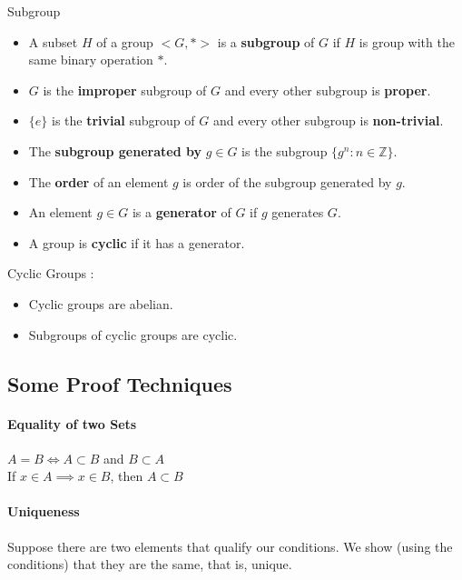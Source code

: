 \begin{definition} Subgroup
	\begin{itemize}
		\item A subset $H$ of a group $<\! G,\ast\! >$ is a \textbf{subgroup} of $G$ if $H$ is group with the same binary operation $\ast$. %
		\item $G$ is the \textbf{improper} subgroup of $G$ and every other subgroup is \textbf{proper}.%
		\item $\{e\}$ is the \textbf{trivial} subgroup of $G$ and every other subgroup is \textbf{non-trivial}.%
		\item The \textbf{subgroup generated by} $g \in G$ is the subgroup $\{ g^n : n \in \mathbb{Z} \}$.%
		\item The \textbf{order} of an element $g$ is order of the subgroup generated by $g$.%
		\item An element $g \in G$ is a \textbf{generator} of $G$ if $g$ generates $G$.%
		\item A group is \textbf{cyclic} if it has a generator.%
	\end{itemize}
\end{definition}

\begin{remark}
	Cyclic Groups :
	\begin{itemize}
		\item Cyclic groups are abelian.%
		\item Subgroups of cyclic groups are cyclic.%
	\end{itemize}
\end{remark}

\subsection{Some Proof Techniques}
\paragraph{Equality of two Sets}
$A = B \iff A \subset B$ and $B \subset A$\\
If $x \in A \implies x \in B$, then $A \subset B$
\paragraph{Uniqueness}
	Suppose there are two elements that qualify our conditions. We show (using the conditions) that they are the same, that is, unique.\\

